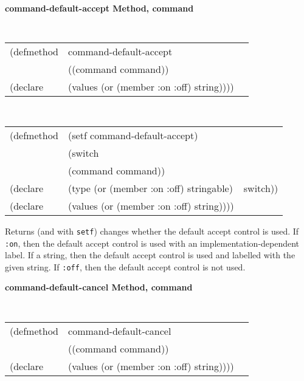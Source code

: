 {\samepage
{\large {\bf command-default-accept \hfill Method, command}}
\begin{flushright} \parbox[t]{6.125in}{
\tt
\begin{tabular}{lll}
\raggedright
(defmethod & command-default-accept & \\
           & ((command  command)) \\
(declare   & (values (or (member :on :off) string))))
\end{tabular}
\rm

}\end{flushright}}

{\samepage
\begin{flushright} \parbox[t]{6.125in}{
\tt
\begin{tabular}{lll}
\raggedright
(defmethod & (setf command-default-accept) & \\
         & (switch \\
         & (command command)) \\
(declare &(type (or (member :on :off) stringable) & switch))\\
(declare &(values (or (member :on :off) string))))
\end{tabular}
\rm
}
\end{flushright}}



\begin{flushright} \parbox[t]{6.125in}{
Returns  (and with {\tt setf}) changes whether the default accept control is
used. If {\tt :on}, then the default accept control is used with an
implementation-dependent label. If a string, then the default accept control
is used and labelled with the given string. If {\tt :off}, then the default
accept control is not used.

}\end{flushright}

{\samepage
{\large {\bf command-default-cancel \hfill Method, command}}
\begin{flushright} \parbox[t]{6.125in}{
\tt
\begin{tabular}{lll}
\raggedright
(defmethod & command-default-cancel & \\
           & ((command  command)) \\
(declare   & (values (or (member :on :off) string))))
\end{tabular}
\rm

}\end{flushright}}

